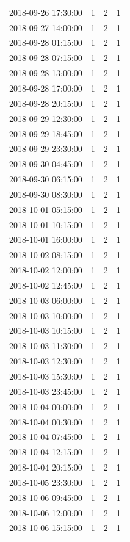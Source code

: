 \begin{tabular}{lrrr}
2018-09-26 17:30:00 & 1 & 2 & 1 \\
2018-09-27 14:00:00 & 1 & 2 & 1 \\
2018-09-28 01:15:00 & 1 & 2 & 1 \\
2018-09-28 07:15:00 & 1 & 2 & 1 \\
2018-09-28 13:00:00 & 1 & 2 & 1 \\
2018-09-28 17:00:00 & 1 & 2 & 1 \\
2018-09-28 20:15:00 & 1 & 2 & 1 \\
2018-09-29 12:30:00 & 1 & 2 & 1 \\
2018-09-29 18:45:00 & 1 & 2 & 1 \\
2018-09-29 23:30:00 & 1 & 2 & 1 \\
2018-09-30 04:45:00 & 1 & 2 & 1 \\
2018-09-30 06:15:00 & 1 & 2 & 1 \\
2018-09-30 08:30:00 & 1 & 2 & 1 \\
2018-10-01 05:15:00 & 1 & 2 & 1 \\
2018-10-01 10:15:00 & 1 & 2 & 1 \\
2018-10-01 16:00:00 & 1 & 2 & 1 \\
2018-10-02 08:15:00 & 1 & 2 & 1 \\
2018-10-02 12:00:00 & 1 & 2 & 1 \\
2018-10-02 12:45:00 & 1 & 2 & 1 \\
2018-10-03 06:00:00 & 1 & 2 & 1 \\
2018-10-03 10:00:00 & 1 & 2 & 1 \\
2018-10-03 10:15:00 & 1 & 2 & 1 \\
2018-10-03 11:30:00 & 1 & 2 & 1 \\
2018-10-03 12:30:00 & 1 & 2 & 1 \\
2018-10-03 15:30:00 & 1 & 2 & 1 \\
2018-10-03 23:45:00 & 1 & 2 & 1 \\
2018-10-04 00:00:00 & 1 & 2 & 1 \\
2018-10-04 00:30:00 & 1 & 2 & 1 \\
2018-10-04 07:45:00 & 1 & 2 & 1 \\
2018-10-04 12:15:00 & 1 & 2 & 1 \\
2018-10-04 20:15:00 & 1 & 2 & 1 \\
2018-10-05 23:30:00 & 1 & 2 & 1 \\
2018-10-06 09:45:00 & 1 & 2 & 1 \\
2018-10-06 12:00:00 & 1 & 2 & 1 \\
2018-10-06 15:15:00 & 1 & 2 & 1 \\

\end{tabular}
